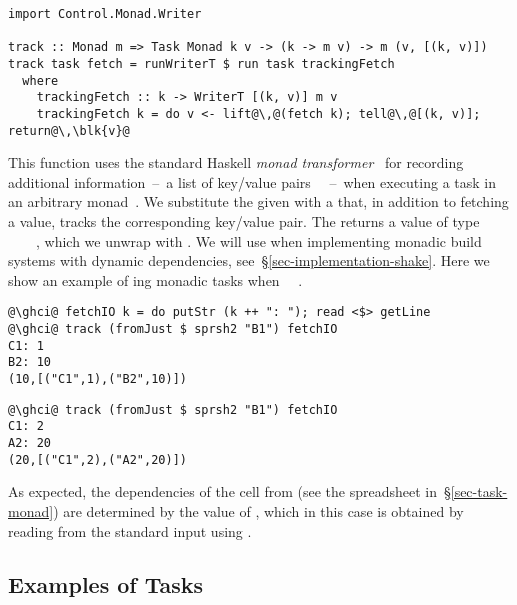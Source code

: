 \vspace{1mm}
\begin{verbatim}
import Control.Monad.Writer

track :: Monad m => Task Monad k v -> (k -> m v) -> m (v, [(k, v)])
track task fetch = runWriterT $ run task trackingFetch
  where
    trackingFetch :: k -> WriterT [(k, v)] m v
    trackingFetch k = do v <- lift@\,@(fetch k); tell@\,@[(k, v)]; return@\,\blk{v}@
\end{verbatim}
\vspace{1mm}

\noindent
This function uses the standard Haskell  \emph{monad
transformer}~\cite{liang1995monad} for recording additional
information~--~a list of key/value pairs \hs{[(@@k,}~\hs{v)]}~--~when executing
a task in an arbitrary monad~. We substitute the given  with a
 that, in addition to fetching a value, tracks the
corresponding key/value pair. The  returns a value of type
~\hs{[(@@k,}~\hs{v)]}~~, which we unwrap with
. We will use  when implementing monadic build systems
with dynamic dependencies, see~\S\ref{sec-implementation-shake}. Here we show an
example of ing monadic tasks when ~\hs{=}~.

\vspace{1mm}
\begin{verbatim}
@\ghci@ fetchIO k = do putStr (k ++ ": "); read <$> getLine
@\ghci@ track (fromJust $ sprsh2 "B1") fetchIO
C1: 1
B2: 10
(10,[("C1",1),("B2",10)])
\end{verbatim}
\vspace{-2mm}
\begin{verbatim}
@\ghci@ track (fromJust $ sprsh2 "B1") fetchIO
C1: 2
A2: 20
(20,[("C1",2),("A2",20)])
\end{verbatim}
\vspace{1mm}

\noindent
As expected, the dependencies of the cell  from  (see the
spreadsheet in~\S\ref{sec-task-monad}) are determined by the value of ,
which in this case is obtained by reading from the standard input using
.

\subsection{Examples of Tasks}\label{sec-task-examples}

